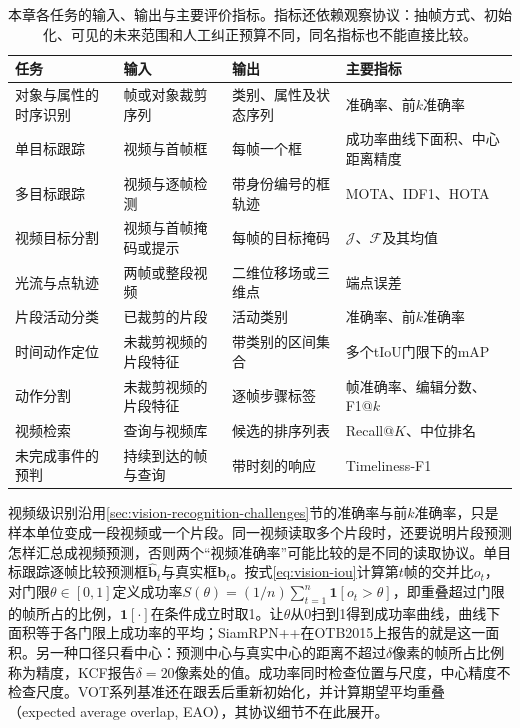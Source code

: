 \begin{table}[tbp]
  \centering
  \small
  \begin{tabularx}{\linewidth}{@{}lXXX@{}}
    \toprule
    任务 & 输入 & 输出 & 主要指标\\
    \midrule
    对象与属性的时序识别 & 帧或对象裁剪序列 & 类别、属性及状态序列 & 准确率、前$k$准确率\\
    单目标跟踪 & 视频与首帧框 & 每帧一个框 & 成功率曲线下面积、中心距离精度\\
    多目标跟踪 & 视频与逐帧检测 & 带身份编号的框轨迹 & MOTA、IDF1、HOTA\\
    视频目标分割 & 视频与首帧掩码或提示 & 每帧的目标掩码 & $\mathcal{J}$、$\mathcal{F}$及其均值\\
    光流与点轨迹 & 两帧或整段视频 & 二维位移场或三维点 & 端点误差\\
    片段活动分类 & 已裁剪的片段 & 活动类别 & 准确率、前$k$准确率\\
    时间动作定位 & 未裁剪视频的片段特征 & 带类别的区间集合 & 多个tIoU门限下的mAP\\
    动作分割 & 未裁剪视频的片段特征 & 逐帧步骤标签 & 帧准确率、编辑分数、F1@$k$\\
    视频检索 & 查询与视频库 & 候选的排序列表 & Recall@$K$、中位排名\\
    未完成事件的预判 & 持续到达的帧与查询 & 带时刻的响应 & Timeliness-F1\\
    \bottomrule
  \end{tabularx}
  \caption{本章各任务的输入、输出与主要评价指标。指标还依赖观察协议：抽帧方式、初始化、可见的未来范围和人工纠正预算不同，同名指标也不能直接比较。}
  \label{tab:vision-video-task-metrics}
\end{table}

视频级识别沿用\ref{sec:vision-recognition-challenges}节的准确率与前$k$准确率，只是样本单位变成一段视频或一个片段。同一视频读取多个片段时，还要说明片段预测怎样汇总成视频预测，否则两个“视频准确率”可能比较的是不同的读取协议。单目标跟踪逐帧比较预测框$\widehat{\bm{b}}_t$与真实框$\bm{b}_t$。按式\eqref{eq:vision-iou}计算第$t$帧的交并比$o_t$，对门限$\theta\in[0,1]$定义成功率$S(\theta)=(1/n)\sum_{t=1}^{n}\bm{1}[o_t>\theta]$，即重叠超过门限的帧所占的比例，$\bm{1}[\cdot]$在条件成立时取1。让$\theta$从0扫到1得到成功率曲线，曲线下面积等于各门限上成功率的平均；SiamRPN++在OTB2015上报告的就是这一面积。另一种口径只看中心：预测中心与真实中心的距离不超过$\delta$像素的帧所占比例称为精度，KCF报告$\delta=20$像素处的值。成功率同时检查位置与尺度，中心精度不检查尺度。VOT系列基准还在跟丢后重新初始化，并计算期望平均重叠（expected average overlap, EAO），其协议细节不在此展开。

